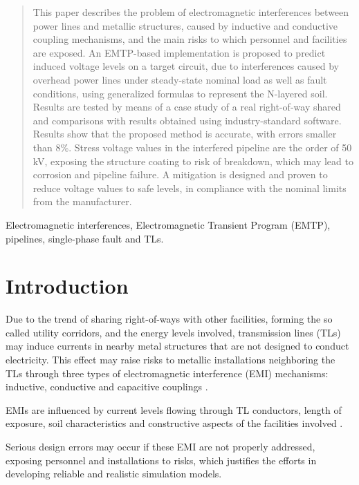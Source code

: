 \documentclass{IEEEtran4PSCC}
\begin{document}
\begin{abstract}
This paper describes the problem of electromagnetic interferences between power lines and metallic structures, caused by inductive and conductive coupling mechanisms, and the main risks to which personnel and facilities are exposed. An EMTP-based implementation is proposed to predict induced voltage levels on a target circuit, due to interferences caused by overhead power lines under steady-state nominal load as well as fault conditions, using generalized formulas to represent the N-layered soil. Results are tested by means of a case study of a real right-of-way shared and comparisons with results obtained using industry-standard software. Results show that the proposed method is accurate, with errors smaller than 8\%. Stress voltage values in the interfered pipeline are the order of 50 kV, exposing the structure  coating to risk of breakdown, which may lead to corrosion and pipeline failure. A mitigation is designed and proven to reduce voltage values to safe levels, in compliance with the nominal limits from the manufacturer.
\end{abstract}

\begin{IEEEkeywords}
Electromagnetic interferences, Electromagnetic Transient Program (EMTP), pipelines, single-phase fault and TLs.
\end{IEEEkeywords}




\section{Introduction}


Due to the trend of sharing right-of-ways with other facilities, forming the so called utility corridors, and the energy levels involved, transmission lines (TLs) may induce currents in nearby metal structures that are not designed to conduct electricity. This effect may raise risks to metallic installations neighboring the TLs through three types of electromagnetic interference (EMI) mechanisms: inductive, conductive and capacitive couplings \cite{CIGREWG36}.

EMIs are influenced by current levels flowing through TL conductors, length of exposure, soil characteristics and constructive aspects of the facilities involved \cite{CIGREWG36}. 

Serious design errors may occur if these EMI are not properly addressed, exposing personnel and installations to risks, which justifies the efforts in developing reliable and realistic simulation models.
\end{document}
